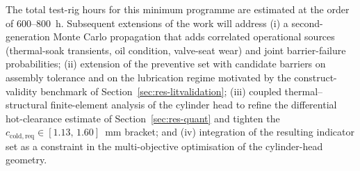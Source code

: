 The total test-rig hours for this minimum programme are estimated at
the order of 600--800~h. Subsequent extensions of the work will
address (i) a second-generation Monte Carlo propagation that adds
correlated operational sources (thermal-soak transients, oil
condition, valve-seat wear) and joint barrier-failure probabilities;
(ii) extension of the preventive set with candidate barriers on
assembly tolerance and on the lubrication regime motivated by the
construct-validity benchmark of Section~\ref{sec:res-litvalidation};
(iii) coupled thermal--structural finite-element analysis of the
cylinder head to refine the differential hot-clearance estimate of
Section~\ref{sec:res-quant} and tighten the
$c_{\mathrm{cold,req}}\in [1.13,\,1.60]$~mm bracket; and
(iv) integration of the resulting indicator set as a constraint in
the multi-objective optimisation of the cylinder-head geometry.
